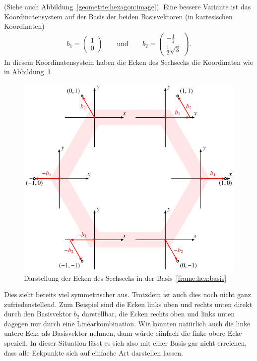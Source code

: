 (Siehe auch Abbildung~\ref{geometrie:hexagon:image}).
Eine bessere Variante ist das Koordinatensystem auf der Basis der beiden
Basisvektoren (in kartesischen Koordinaten)
\begin{equation}
\begin{aligned}
b_1 = \begin{pmatrix} 1\\0\end{pmatrix}
\qquad
\text{und}
\qquad
b_2 = \begin{pmatrix} -\frac12\\\frac12\sqrt{3}\end{pmatrix}.
\end{aligned}
\label{frame:hex:basis}
\end{equation}
In diesem Koordinatensystem haben die Ecken des Sechsecks die Koordinaten
wie in Abbildung~\ref{frame:hex:basisanalyse}
\begin{figure}
\centering
\includegraphics{chapters/1-geometrie/images/hexagon2.pdf}
\caption{Darstellung der Ecken des Sechsecks in der
Basis~\eqref{frame:hex:basis}
\label{frame:hex:basisanalyse}}
\end{figure}
Dies sieht bereits viel symmetrischer aus.
Trotzdem ist auch dies noch nicht ganz zufriedenstellend. 
Zum Beispiel sind die Ecken links oben und rechts unten direkt durch den
Basisvektor $b_2$ darstellbar, die Ecken rechts oben und links unten
dagegen nur durch eine Linearkombination.
Wir könnten natürlich auch die linke untere Ecke als Basisvektor nehmen,
dann würde eiinfach die linke obere Ecke speziell.
In dieser Situation lässt es sich also mit einer Basis gar nicht erreichen,
dass alle Eckpunkte sich auf einfache Art darstellen lassen.


